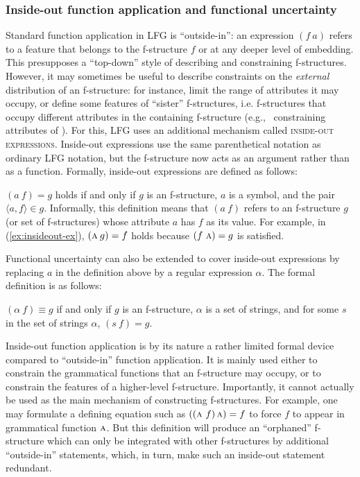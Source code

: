 \documentclass[output=paper,hidelinks]{langscibook}
\begin{document}
   \subsubsection{Inside-out function application and functional uncertainty}
   \label{sec:CoreConcepts:IOFU}
 
 Standard function application in LFG is ``outside-in'': an expression $(f~a)$ refers to a feature that belongs to the f-structure $f$ or at any deeper level of embedding. This presupposes a ``top-down'' style of describing and constraining f-structures. However, it may sometimes be useful to describe constraints on the \textit{external} distribution of an f-structure: for instance, limit the range of attributes it may occupy, or define some features of ``sister'' f-structures, i.e. f-structures that occupy different attributes in the containing f-structure (e.g., \SUBJ\ constraining attributes of \OBJ). For this, LFG uses an additional mechanism called \textsc{inside-out expressions}. Inside-out expressions use the same parenthetical notation as ordinary LFG notation, but the f-structure now acts as an argument rather than as a function. Formally, inside-out expressions are defined as follows:
 
 \ea
 $(a \: f) = g$ holds if and only if $g$ is an f-structure, $a$ is a symbol, and the pair $\langle a, f \rangle \in g$.
 \z
Informally, this definition means that $(a~f)$ refers to an f-structure $g$ (or set of f-structures) whose attribute $a$ has $f$ as its value. For example, in (\ref{ex:insideout-ex}), $(\textsc{a} \: g) = f$ holds because $(f~\textsc{a}) = g$ is satisfied.
 
 \ea\label{ex:insideout-ex}
 \z
  
  Functional uncertainty can also be extended to cover inside-out expressions by replacing $a$ in the definition above by a regular expression $\alpha$. The formal definition is as follows:
  
  \ea
  $(\alpha \: f) \equiv{} g$ if and only if $g$ is an f-structure, $\alpha$ is a set of strings, and for some $s$ in the set of strings $\alpha$, $(s \: f) = g$.
  \z
  
  Inside-out function application is by its nature a rather limited formal device compared to ``outside-in'' function application. It is mainly used either to constrain the grammatical functions that an f-structure may occupy, or to constrain the features of a higher-level f-structure. Importantly, it cannot actually be used as the main mechanism of constructing f-structures. For example, one may formulate a defining equation such as $((\textsc{a}~f)\,\textsc{a}) = f$ to force $f$ to appear in grammatical function $\textsc{a}$. But this definition will produce an ``orphaned'' f-structure which can only be integrated with other f-structures by additional ``outside-in'' statements, which, in turn, make such an inside-out statement redundant.
  
\end{document}
